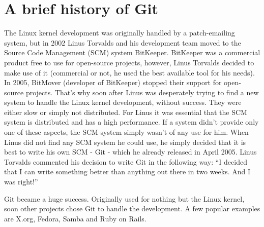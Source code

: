 \section {A brief history of Git}

The Linux kernel development was originally handled by a patch-emailing system, but in 2002 Linus Torvalds and his development team moved to the Source Code Management (SCM) system BitKeeper. BitKeeper was a commercial product free to use for open-source projects, however, Linus Torvalds decided to make use of it (commercial or not, he used the best available tool for his needs).
In 2005, BitMover (developer of BitKeeper) stopped their support for open-source projects. That's why soon after Linus was desperately trying to find a new system to handle the Linux kernel development, without success. They were either slow or simply not distributed. For Linus it was essential that the SCM system is distributed and has a high performance. If a system didn't provide only one of these aspects, the SCM system simply wasn't of any use for him. When Linus did not find any SCM system he could use, he simply decided that it is best to write his own SCM - Git - which he already released in April 2005. Linus Torvalds commented his decision to write Git in the following way: "`I decided that I can write something better than anything out there in two weeks. And I was right!"'\cite{googletechtalk2007}

Git became a huge success. Originally used for nothing but the Linux kernel, soon other projects chose Git to handle the development. A few popular examples are X.org, Fedora, Samba and Ruby on Rails. \cite{gitinternals2008}